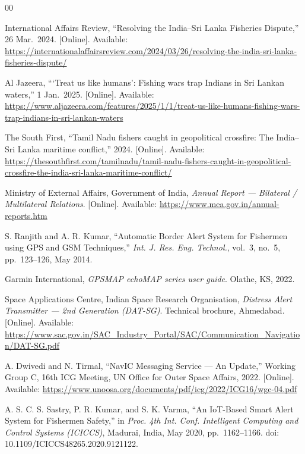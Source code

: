 \documentclass[conference]{IEEEtran}
\begin{document}
\begin{thebibliography}{00}

 International Affairs Review, ``Resolving the India--Sri Lanka Fisheries Dispute,'' 26 Mar.\ 2024. [Online]. Available: \url{https://internationalaffairsreview.com/2024/03/26/resolving-the-india-sri-lanka-fisheries-dispute/}

 Al Jazeera, ```Treat us like humans': Fishing wars trap Indians in Sri Lankan waters,'' 1 Jan.\ 2025. [Online]. Available: \url{https://www.aljazeera.com/features/2025/1/1/treat-us-like-humans-fishing-wars-trap-indians-in-sri-lankan-waters}

 The South First, ``Tamil Nadu fishers caught in geopolitical crossfire: The India--Sri Lanka maritime conflict,'' 2024. [Online]. Available: \url{https://thesouthfirst.com/tamilnadu/tamil-nadu-fishers-caught-in-geopolitical-crossfire-the-india-sri-lanka-maritime-conflict/}

 Ministry of External Affairs, Government of India, \emph{Annual Report --- Bilateral / Multilateral Relations}. [Online]. Available: \url{https://www.mea.gov.in/annual-reports.htm}

 S. Ranjith and A. R. Kumar, ``Automatic Border Alert System for Fishermen using GPS and GSM Techniques,'' \emph{Int. J. Res. Eng. Technol.}, vol.~3, no.~5, pp.~123--126, May 2014.

 Garmin International, \emph{GPSMAP echoMAP series user guide}. Olathe, KS, 2022.

 Space Applications Centre, Indian Space Research Organisation, \emph{Distress Alert Transmitter --- 2nd Generation (DAT-SG)}. Technical brochure, Ahmedabad. [Online]. Available: \url{https://www.sac.gov.in/SAC_Industry_Portal/SAC/Communication_Navigation/DAT-SG.pdf}

 A. Dwivedi and N. Tirmal, ``NavIC Messaging Service --- An Update,'' Working Group C, 16th ICG Meeting, UN Office for Outer Space Affairs, 2022. [Online]. Available: \url{https://www.unoosa.org/documents/pdf/icg/2022/ICG16/wgc-04.pdf}

 A. S. C. S. Sastry, P. R. Kumar, and S. K. Varma, ``An IoT-Based Smart Alert System for Fishermen Safety,'' in \emph{Proc. 4th Int. Conf. Intelligent Computing and Control Systems (ICICCS)}, Madurai, India, May 2020, pp.~1162--1166. doi:\,10.1109/ICICCS48265.2020.9121122.


\end{thebibliography}
\end{document}
